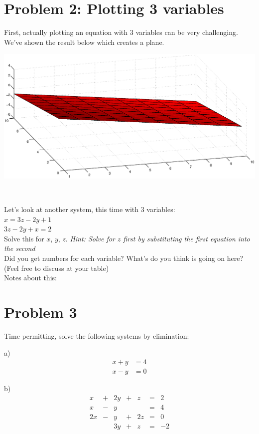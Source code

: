 \documentclass{article}
\begin{document}
\begin{flushleft}
\vspace{0.3in}
\newpage
\section*{Problem 2: Plotting 3 variables}
\vspace{0.1in}
First, actually plotting an equation with 3 variables can be very challenging. We've shown the result below which creates a plane.\\

\begin{minipage}{3in}
\includegraphics[scale=0.5]{planepic.eps}
\end{minipage}\\
\vspace{0.1in}

Let's look at another system, this time with 3 variables:\\
$x=3z-2y+1$\\
$3z-2y+x=2$\\
Solve this for $x$, $y$, $z$. \textit{Hint: Solve for $z$ first by substituting the first equation into the second}\\
\vspace{1.5in}
Did you get numbers for each variable? What's do you think is going on here? (Feel free to discuss at your table)\\
\vspace{1in}
\Large Notes about this:
\normalsize
\vspace{2in}


\section*{Problem 3}
Time permitting, solve the following systems by elimination:\\

\end{flushleft}
a)
\begin{align*}
x+y&=4\\
x-y&=0
\end{align*}
\vspace{0.1in}

b)
\begin{equation*}
\begin{array}{ccccccr}
x& + &2y&+&z&= &2\\
x& - & y& & &= &4\\
2x&- & y&+&2z&=&0\\
  &  &3y&+& z&=&-2
\end{array}
\end{equation*}
\end{document}
